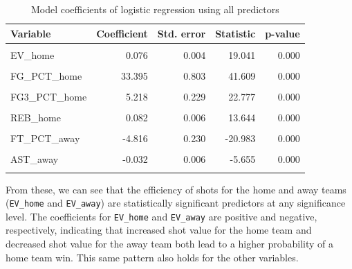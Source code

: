 \documentclass[
  12pt,
  a4paper,
]{article}
\begin{document}
\begin{table}[H]

\caption{\label{tab:tidyfit}Model coefficients of
                 logistic regression using all predictors}
\centering
\begin{tabular}[t]{lrrrr}
\toprule
Variable & Coefficient & Std. error & Statistic & p-value\\
\midrule
\cellcolor{gray!30}{(Intercept)} & \cellcolor{gray!30}{-0.020} & \cellcolor{gray!30}{0.682} & \cellcolor{gray!30}{-0.029} & \cellcolor{gray!30}{0.977}\\
EV\_home & 0.076 & 0.004 & 19.041 & 0.000\\
\cellcolor{gray!30}{EV\_away} & \cellcolor{gray!30}{-0.086} & \cellcolor{gray!30}{0.004} & \cellcolor{gray!30}{-21.616} & \cellcolor{gray!30}{0.000}\\
FG\_PCT\_home & 33.395 & 0.803 & 41.609 & 0.000\\
\cellcolor{gray!30}{FT\_PCT\_home} & \cellcolor{gray!30}{5.442} & \cellcolor{gray!30}{0.241} & \cellcolor{gray!30}{22.589} & \cellcolor{gray!30}{0.000}\\
FG3\_PCT\_home & 5.218 & 0.229 & 22.777 & 0.000\\
\cellcolor{gray!30}{AST\_home} & \cellcolor{gray!30}{0.044} & \cellcolor{gray!30}{0.006} & \cellcolor{gray!30}{7.524} & \cellcolor{gray!30}{0.000}\\
REB\_home & 0.082 & 0.006 & 13.644 & 0.000\\
\cellcolor{gray!30}{FG\_PCT\_away} & \cellcolor{gray!30}{-33.721} & \cellcolor{gray!30}{0.808} & \cellcolor{gray!30}{-41.756} & \cellcolor{gray!30}{0.000}\\
FT\_PCT\_away & -4.816 & 0.230 & -20.983 & 0.000\\
\cellcolor{gray!30}{FG3\_PCT\_away} & \cellcolor{gray!30}{-5.174} & \cellcolor{gray!30}{0.229} & \cellcolor{gray!30}{-22.583} & \cellcolor{gray!30}{0.000}\\
AST\_away & -0.032 & 0.006 & -5.655 & 0.000\\
\cellcolor{gray!30}{REB\_away} & \cellcolor{gray!30}{-0.070} & \cellcolor{gray!30}{0.006} & \cellcolor{gray!30}{-11.768} & \cellcolor{gray!30}{0.000}\\
\bottomrule
\end{tabular}
\end{table}

From these, we can see that the efficiency of shots for the home and away teams (\texttt{EV\_home} and \texttt{EV\_away}) are statistically significant predictors at any significance level. The coefficients for \texttt{EV\_home} and \texttt{EV\_away} are positive and negative, respectively, indicating that increased shot value for the home team and decreased shot value for the away team both lead to a higher probability of a home team win. This same pattern also holds for the other variables.
\end{document}
